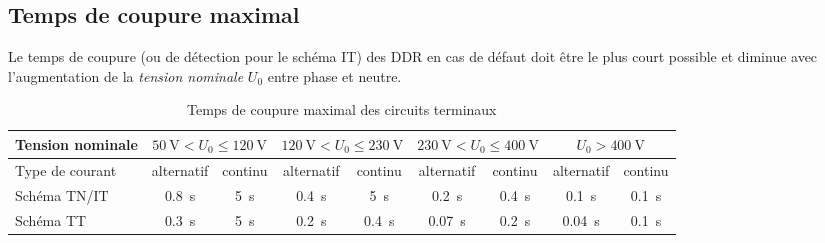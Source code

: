\subsection{Temps de coupure maximal\label{tab:temps_coupure_DDR}}

Le temps de coupure (ou de détection pour le schéma IT) des DDR en cas de défaut doit être le plus court possible et diminue avec l'augmentation de la \emph{tension nominale} $U_0$ entre phase et neutre.

\begin{table}[h]
\caption{Temps de coupure maximal des circuits terminaux}
\begin{tabularx}{\linewidth}{X cccccccc}
\toprule
Tension nominale		& \multicolumn{2}{c}{$\SI{50}{\volt}<U_0\leq\SI{120}{\volt}$} 	& \multicolumn{2}{c}{$\SI{120}{\volt}<U_0\leq\SI{230}{\volt}$} & \multicolumn{2}{c}{$\SI{230}{\volt}<U_0\leq\SI{400}{\volt}$}		& \multicolumn{2}{c}{$U_0>\SI{400}{\volt}$}\\
\midrule
Type de courant		& alternatif	& continu	& alternatif	& continu	& alternatif	& continu	& alternatif	& continu \\
\addlinespace
Schéma TN/IT	& \SI{0,8}{\second}	&	\SI{5}{\second}	&	\SI{0,4}{\second}	&	\SI{5}{\second}	&	\SI{0,2}{\second}	&	\SI{0,4}{\second}	&	\SI{0,1}{\second}	&	\SI{0,1}{\second} \\	
\addlinespace
Schéma TT	& \SI{0,3}{\second}	&	\SI{5}{\second}	&	\SI{0,2}{\second}	&	\SI{0,4}{\second}	&	\SI{0,07}{\second}	&	\SI{0,2}{\second}	&	\SI{0,04}{\second}	&	\SI{0,1}{\second} \\	
\bottomrule
\end{tabularx}
\end{table}

%

